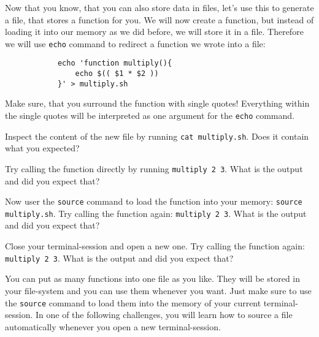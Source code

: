 \begin{challenge}
    \begin{task}
        Now that you know, that you can also store data in files, let's use this to generate a file, that stores a function for you.
        We will now create a function, but instead of loading it into our memory as we did before, we will store it in a file.
        Therefore we will use \texttt{echo} command to redirect a function we wrote into a file:
        \begin{lstlisting}
            echo 'function multiply(){
                echo $(( $1 * $2 ))
            }' > multiply.sh
        \end{lstlisting}
        Make sure, that you surround the function with single quotes! 
        Everything within the single quotes will be interpreted as one argument for the \texttt{echo} command.
        \begin{questions}
            \item Inspect the content of the new file by running \texttt{cat multiply.sh}. Does it contain what you expected?
            \item Try calling the function directly by running \texttt{multiply 2 3}. What is the output and did you expect that?
            \item Now user the \texttt{source} command to load the function into your memory: \texttt{source multiply.sh}. Try calling the function again: \texttt{multiply 2 3}. What is the output and did you expect that?
            \item Close your terminal-session and open a new one. Try calling the function again: \texttt{multiply 2 3}. What is the output and did you expect that?
        \end{questions}
    \end{task}


    \begin{advice}
        You can put as many functions into one file as you like. 
        They will be stored in your file-system and you can use them whenever you want. 
        Just make sure to use the \texttt{source} command to load them into the memory of your current terminal-session.
        In one of the following challenges, you will learn how to source a file automatically whenever you open a new terminal-session.
    \end{advice}
\end{challenge}
